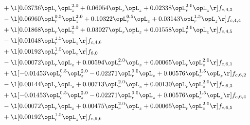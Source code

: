 \begin{alignat}{2}
& + \l[  0.03736 \opL_r \opL_z^{2.0} +  0.06054 \opL_r \opL_z +  0.02338 \opL_r^{2.0} \opL_z  \r] f_{c,4,3} \nonumber \\ 
& - \l[  0.06960 \opL_r^{0.5} \opL_z^{2.0} +  0.10322 \opL_r^{0.5} \opL_z +  0.03143 \opL_r^{1.5} \opL_z  \r] f_{c,4,4} \nonumber \\ 
& + \l[  0.01868 \opL_r \opL_z^{2.0} +  0.03027 \opL_r \opL_z +  0.01558 \opL_r^{2.0} \opL_z  \r] f_{c,4,5} \nonumber \\ 
& - \l[  0.01048 \opL_r^{1.5} \opL_z  \r] f_{c,4,6} \nonumber \\ 
& + \l[  0.00192 \opL_r^{1.5} \opL_z  \r] f_{6,0} \nonumber \\ 
& - \l[  0.00072 \opL_r \opL_z +  0.00594 \opL_r^{2.0} \opL_z +  0.00065 \opL_r \opL_z^{2.0}  \r] f_{c,6,1} \nonumber \\ 
& + \l[  -0.01453 \opL_r^{0.5} \opL_z^{2.0}   -0.02271 \opL_r^{0.5} \opL_z +  0.00576 \opL_r^{1.5} \opL_z  \r] f_{c,6,2} \nonumber \\ 
& - \l[  0.00144 \opL_r \opL_z +  0.00713 \opL_r^{2.0} \opL_z +  0.00130 \opL_r \opL_z^{2.0}  \r] f_{c,6,3} \nonumber \\ 
& + \l[  -0.01453 \opL_r^{0.5} \opL_z^{2.0}   -0.02271 \opL_r^{0.5} \opL_z +  0.00576 \opL_r^{1.5} \opL_z  \r] f_{c,6,4} \nonumber \\ 
& - \l[  0.00072 \opL_r \opL_z +  0.00475 \opL_r^{2.0} \opL_z +  0.00065 \opL_r \opL_z^{2.0}  \r] f_{c,6,5} \nonumber \\ 
& + \l[  0.00192 \opL_r^{1.5} \opL_z  \r] f_{c,6,6} \nonumber \\ 
\end{alignat} 


